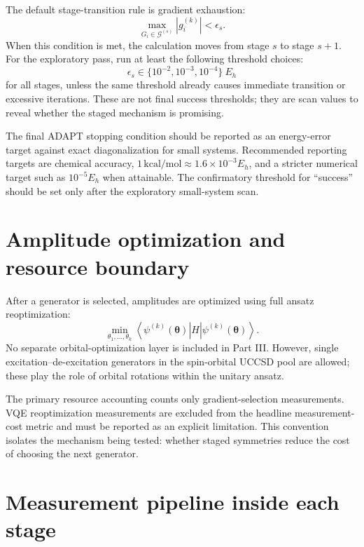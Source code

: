 \documentclass[11pt]{article}
\newcommand{\ket}[1]{\left|#1\right\rangle}
\newcommand{\bra}[1]{\left\langle#1\right|}
\begin{document}
The default stage-transition rule is gradient exhaustion:
\begin{equation}
    \max_{G_i\in\mathcal G^{(s)}} |g_i^{(k)}| < \epsilon_s.
\end{equation}
When this condition is met, the calculation moves from stage $s$ to stage $s+1$. For the exploratory pass, run at least the following threshold choices:
\begin{equation}
    \epsilon_s\in\{10^{-2},10^{-3},10^{-4}\}\ E_h
\end{equation}
for all stages, unless the same threshold already causes immediate transition or excessive iterations. These are not final success thresholds; they are scan values to reveal whether the staged mechanism is promising.

The final ADAPT stopping condition should be reported as an energy-error target against exact diagonalization for small systems. Recommended reporting targets are chemical accuracy, $1\,\mathrm{kcal/mol}\approx 1.6\times 10^{-3}E_h$, and a stricter numerical target such as $10^{-5}E_h$ when attainable. The confirmatory threshold for ``success'' should be set only after the exploratory small-system scan.

\section{Amplitude optimization and resource boundary}

After a generator is selected, amplitudes are optimized using full ansatz reoptimization:
\begin{equation}
    \min_{\theta_1,\ldots,\theta_k}
    \bra{\psi^{(k)}(\bm\theta)}H\ket{\psi^{(k)}(\bm\theta)}.
\end{equation}
No separate orbital-optimization layer is included in Part III. However, single excitation--de-excitation generators in the spin-orbital UCCSD pool are allowed; these play the role of orbital rotations within the unitary ansatz.

The primary resource accounting counts only gradient-selection measurements. VQE reoptimization measurements are excluded from the headline measurement-cost metric and must be reported as an explicit limitation. This convention isolates the mechanism being tested: whether staged symmetries reduce the cost of choosing the next generator.

\section{Measurement pipeline inside each stage}
\end{document}
